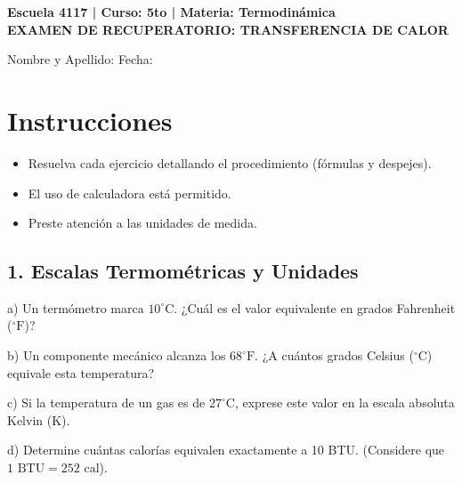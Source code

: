 \documentclass[12pt]{article}
\begin{document}
\begin{center}
    \textbf{Escuela 4117 | Curso: 5to | Materia: Termodinámica} \\
    \Large \textbf{EXAMEN DE RECUPERATORIO: TRANSFERENCIA DE CALOR}
\end{center}

\vspace{0.5cm}

\noindent Nombre y Apellido: \hrulefill \quad Fecha: \hrulefill

\vspace{0.8cm}

\section*{Instrucciones}
\begin{itemize}
    \item Resuelva cada ejercicio detallando el procedimiento (fórmulas y despejes).
    \item El uso de calculadora está permitido.
    \item Preste atención a las unidades de medida.
\end{itemize}

\hr

\subsection*{1. Escalas Termométricas y Unidades}

a) Un termómetro marca $10^\circ\text{C}$. ¿Cuál es el valor equivalente en grados Fahrenheit ($^\circ\text{F}$)?

\vspace{3cm}

b) Un componente mecánico alcanza los $68^\circ\text{F}$. ¿A cuántos grados Celsius ($^\circ\text{C}$) equivale esta temperatura?

\vspace{3cm}

c) Si la temperatura de un gas es de $27^\circ\text{C}$, exprese este valor en la escala absoluta Kelvin (K).

\vspace{3cm}

d) Determine cuántas calorías equivalen exactamente a 10 BTU. (Considere que $1\text{ BTU} = 252\text{ cal}$).

\vspace{3cm}

\hr
\end{document}
